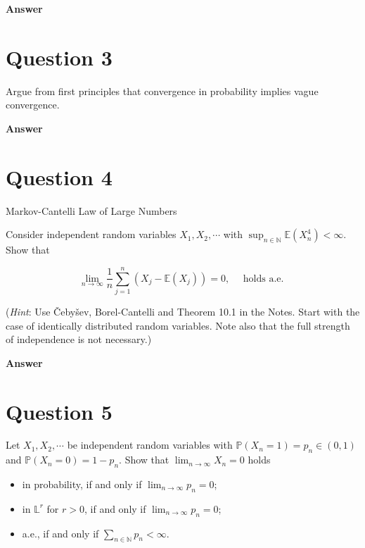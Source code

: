 \documentclass[letterpaper]{article}
\begin{document}
		\textbf{Answer}
		
		\clearpage
		
		\section{Question 3}
		
		Argue from first principles that convergence in probability implies vague convergence.
		
		\textbf{Answer}
		
		\clearpage
		
		\section{Question 4}
		
		{\color{deepred}  Markov-Cantelli Law of Large Numbers}
		
		 Consider independent random variables $X_{1}, X_{2}, \cdots$ with $\sup _{n \in \mathbb{N}} \mathbb{E}\left(X_{n}^{4}\right)<\infty$. Show that
		
		$$
		\lim _{n \rightarrow \infty} \frac{1}{n} \sum_{j=1}^{n}\left(X_{j}-\mathbb{E}\left(X_{j}\right)\right)=0, \quad \text { holds a.e. }
		$$
		
		(\emph{Hint}: Use Čebyšev, Borel-Cantelli and Theorem 10.1 in the Notes. Start with the case of identically distributed random variables. Note also that the full strength of independence is not necessary.)
		
		
		\textbf{Answer}
		
		\clearpage
		
		\section{Question 5}
		
		Let $X_{1}, X_{2}, \cdots$ be independent random variables with $\mathbb{P}\left(X_{n}=1\right)=p_{n} \in (0,1)$ and $\mathbb{P}\left(X_{n}=0\right)=1-p_{n}$. Show that $\lim _{n \rightarrow \infty} X_{n}=0$ holds
		
		\begin{itemize}
			\item in probability, if and only if $\lim _{n \rightarrow \infty} p_{n}=0$;
			\item in $\mathbb{L}^{r}$ for $r>0$, if and only if $\lim _{n \rightarrow \infty} p_{n}=0$;
			\item a.e., if and only if $\sum_{n \in \mathbb{N}} p_{n}<\infty$.
		\end{itemize}
		
\end{document}
